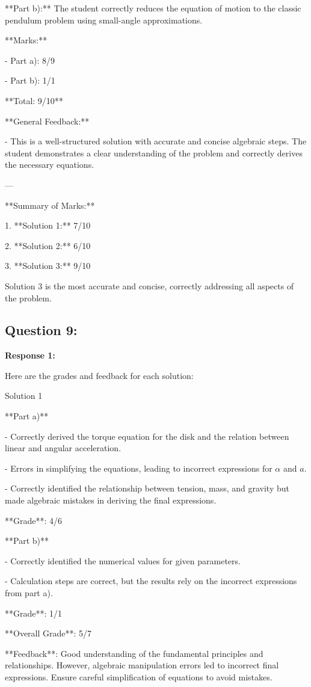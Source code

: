 \documentclass[a4paper,11pt]{article}
\begin{document}
**Part b):** The student correctly reduces the equation of motion to the classic pendulum problem using small-angle approximations.

**Marks:**

- Part a): 8/9

- Part b): 1/1

**Total: 9/10**

**General Feedback:**

- This is a well-structured solution with accurate and concise algebraic steps. The student demonstrates a clear understanding of the problem and correctly derives the necessary equations.

---

**Summary of Marks:**

1. **Solution 1:** 7/10

2. **Solution 2:** 6/10

3. **Solution 3:** 9/10

Solution 3 is the most accurate and concise, correctly addressing all aspects of the problem.

\subsection*{Question 9:}

\textbf{Response 1:}

Here are the grades and feedback for each solution:

Solution 1

**Part a)**

- Correctly derived the torque equation for the disk and the relation between linear and angular acceleration.

- Errors in simplifying the equations, leading to incorrect expressions for \( \alpha \) and \( a \).

- Correctly identified the relationship between tension, mass, and gravity but made algebraic mistakes in deriving the final expressions.

**Grade**: 4/6

**Part b)**

- Correctly identified the numerical values for given parameters.

- Calculation steps are correct, but the results rely on the incorrect expressions from part a).

**Grade**: 1/1

**Overall Grade**: 5/7

**Feedback**: Good understanding of the fundamental principles and relationships. However, algebraic manipulation errors led to incorrect final expressions. Ensure careful simplification of equations to avoid mistakes.
\end{document}
